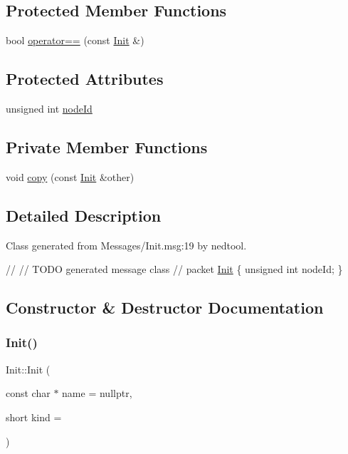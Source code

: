 \subsection*{Protected Member Functions}
\begin{DoxyCompactItemize}
\item 
bool \hyperlink{class_init_a474b7c9ffdf72a6b2b58558ce68bb03e}{operator==} (const \hyperlink{class_init}{Init} \&)
\end{DoxyCompactItemize}
\subsection*{Protected Attributes}
\begin{DoxyCompactItemize}
\item 
unsigned int \hyperlink{class_init_abc9fcf6151621f0ac808cd29e14239c9}{node\+Id}
\end{DoxyCompactItemize}
\subsection*{Private Member Functions}
\begin{DoxyCompactItemize}
\item 
void \hyperlink{class_init_a045745f591e312608e5ee3639f4459ba}{copy} (const \hyperlink{class_init}{Init} \&other)
\end{DoxyCompactItemize}


\subsection{Detailed Description}
Class generated from {\ttfamily Messages/\+Init.\+msg\+:19} by nedtool. 


\begin{DoxyPre}
//
// TODO generated message class
//
packet \hyperlink{class_init}{Init}
\{
    unsigned int nodeId;
\}
\end{DoxyPre}
 

\subsection{Constructor \& Destructor Documentation}
\mbox{\label{class_init_a763a386107f8ea21acfd24f243e0f73c}} 
\subsubsection{\texorpdfstring{Init()}{Init()}\hspace{0.1cm}{\footnotesize\ttfamily [1/2]}}
{\footnotesize\ttfamily Init\+::\+Init (\begin{DoxyParamCaption}\item[{const char $\ast$}]{name = {\ttfamily nullptr},  }\item[{short}]{kind = {} }\end{DoxyParamCaption})}

